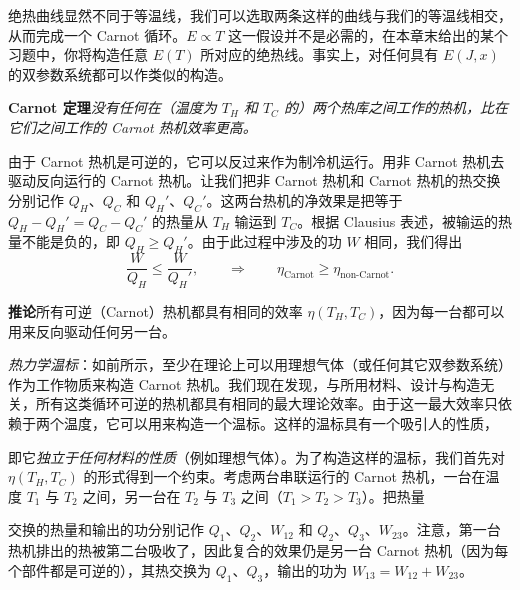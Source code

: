 
绝热曲线显然不同于等温线，我们可以选取两条这样的曲线与我们的等温线相交，从而完成一个 Carnot 循环。$E\propto T$ 这一假设并不是必需的，在本章末给出的某个习题中，你将构造任意 $E(T)$ 所对应的绝热线。事实上，对任何具有 $E(J,x)$ 的双参数系统都可以作类似的构造。

\textbf{Carnot 定理}\quad\emph{没有任何在（温度为 $T_H$ 和 $T_C$ 的）两个热库之间工作的热机，比在它们之间工作的 Carnot 热机效率更高。}

由于 Carnot 热机是可逆的，它可以反过来作为制冷机运行。用非 Carnot 热机去驱动反向运行的 Carnot 热机。让我们把非 Carnot 热机和 Carnot 热机的热交换分别记作 $Q_H$、$Q_C$ 和 $Q_H'$、$Q_C'$。这两台热机的净效果是把等于 $Q_H-Q_H'=Q_C-Q_C'$ 的热量从 $T_H$ 输运到 $T_C$。根据 Clausius 表述，被输运的热量不能是负的，即 $Q_H\ge Q_H'$。由于此过程中涉及的功 $W$ 相同，我们得出
\begin{equation}
\frac{W}{Q_H}\le\frac{W}{Q_H'},\qquad\Longrightarrow\qquad\eta_{\text{Carnot}}\ge\eta_{\text{non-Carnot}}.
\label{eq:1.20}
\end{equation}


\textbf{推论}\quad 所有可逆（Carnot）热机都具有相同的效率 $\eta(T_H,T_C)$，因为每一台都可以用来反向驱动任何另一台。

\emph{热力学温标}：如前所示，至少在理论上可以用理想气体（或任何其它双参数系统）作为工作物质来构造 Carnot 热机。我们现在发现，与所用材料、设计与构造无关，所有这类循环可逆的热机都具有相同的最大理论效率。由于这一最大效率只依赖于两个温度，它可以用来构造一个温标。这样的温标具有一个吸引人的性质，


即它\emph{独立于任何材料的性质}（例如理想气体）。为了构造这样的温标，我们首先对 $\eta(T_H,T_C)$ 的形式得到一个约束。考虑两台串联运行的 Carnot 热机，一台在温度 $T_1$ 与 $T_2$ 之间，另一台在 $T_2$ 与 $T_3$ 之间（$T_1>T_2>T_3$）。把热量

交换的热量和输出的功分别记作 $Q_1$、$Q_2$、$W_{12}$ 和 $Q_2$、$Q_3$、$W_{23}$。注意，第一台热机排出的热被第二台吸收了，因此复合的效果仍是另一台 Carnot 热机（因为每个部件都是可逆的），其热交换为 $Q_1$、$Q_3$，输出的功为 $W_{13}=W_{12}+W_{23}$。

